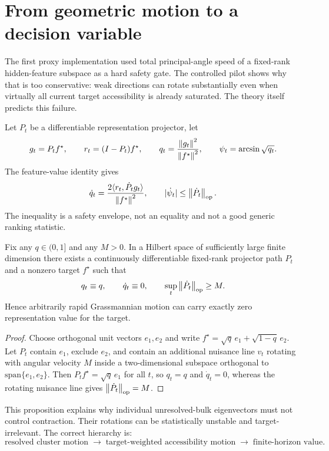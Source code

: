 \section{From geometric motion to a decision variable}
The first proxy implementation used total principal-angle speed of a fixed-rank hidden-feature subspace as a hard safety gate. The controlled pilot shows why that is too conservative: weak directions can rotate substantially even when virtually all current target accessibility is already saturated. The theory itself predicts this failure.

Let $P_t$ be a differentiable representation projector, let
\[
g_t=P_tf^\star,\qquad r_t=(I-P_t)f^\star,
\qquad
q_t=\frac{\left\lVert g_t\right\rVert^2}{\left\lVert f^\star\right\rVert^2},
\qquad
\psi_t=\arcsin\sqrt{q_t}.
\]
The feature-value identity gives
\[
\dot q_t
=
\frac{2\langle r_t,\dot P_tg_t\rangle}{\left\lVert f^\star\right\rVert^2},
\qquad
|\dot\psi_t|\le \left\lVert \dot P_t\right\rVert_{\mathrm{op}}.
\]
The inequality is a safety envelope, not an equality and not a good generic ranking statistic.

\begin{proposition}\label{prop:nuisance-motion}
Fix any $q\in(0,1]$ and any $M>0$. In a Hilbert space of sufficiently large finite dimension there exists a continuously differentiable fixed-rank projector path $P_t$ and a nonzero target $f^\star$ such that
\[
q_t\equiv q,
\qquad
\dot q_t\equiv0,
\qquad
\sup_t\left\lVert \dot P_t\right\rVert_{\mathrm{op}}\ge M.
\]
Hence arbitrarily rapid Grassmannian motion can carry exactly zero representation value for the target.
\end{proposition}

\begin{proof}
Choose orthogonal unit vectors $e_1,e_2$ and write $f^\star=\sqrt q\,e_1+\sqrt{1-q}\,e_2$. Let $P_t$ contain $e_1$, exclude $e_2$, and contain an additional nuisance line $v_t$ rotating with angular velocity $M$ inside a two-dimensional subspace orthogonal to $\mathrm{span}\{e_1,e_2\}$. Then $P_tf^\star=\sqrt q\,e_1$ for all $t$, so $q_t=q$ and $\dot q_t=0$, whereas the rotating nuisance line gives $\left\lVert \dot P_t\right\rVert_{\mathrm{op}}=M$.
\end{proof}

This proposition explains why individual unresolved-bulk eigenvectors must not control contraction. Their rotations can be statistically unstable and target-irrelevant. The correct hierarchy is:
\[
\boxed{
\text{resolved cluster motion}
\;\longrightarrow\;
\text{target-weighted accessibility motion}
\;\longrightarrow\;
\text{finite-horizon value}.}
\]

